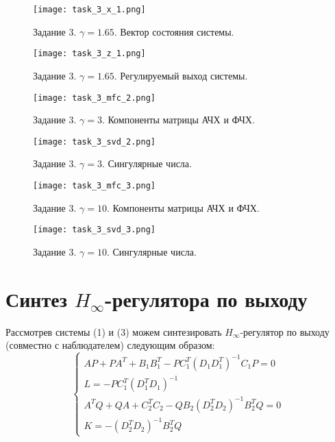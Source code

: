 \begin{figure}[]
    \centering
    \texttt{[image: task\_3\_x\_1.png]}
    \caption{\label{fig:task3_1_3}Задание 3. $\gamma = 1.65$. Вектор состояния системы.}
\end{figure}

\begin{figure}[]
    \centering
    \texttt{[image: task\_3\_z\_1.png]}
    \caption{\label{fig:task3_1_4}Задание 3. $\gamma = 1.65$. Регулируемый выход системы.}
\end{figure}

\begin{figure}[]
    \centering
    \texttt{[image: task\_3\_mfc\_2.png]}
    \caption{\label{fig:task3_2_1}Задание 3. $\gamma = 3$. Компоненты матрицы АЧХ и ФЧХ.}
\end{figure}

\begin{figure}[]
    \centering
    \texttt{[image: task\_3\_svd\_2.png]}
    \caption{\label{fig:task3_2_2}Задание 3. $\gamma = 3$. Сингулярные числа.}
\end{figure}

\begin{figure}[]
    \centering
    \texttt{[image: task\_3\_mfc\_3.png]}
    \caption{\label{fig:task3_1_1}Задание 3. $\gamma = 10$. Компоненты матрицы АЧХ и ФЧХ.}
\end{figure}

\begin{figure}[]
    \centering
    \texttt{[image: task\_3\_svd\_3.png]}
    \caption{\label{fig:task3_1_2}Задание 3. $\gamma = 10$. Сингулярные числа.}
\end{figure}

\pagebreak

\section{Синтез $H_\infty$-регулятора по выходу}

Рассмотрев системы (1) и (3) можем синтезировать $H_\infty$-регулятор по выходу (совместно с наблюдателем) следующим образом:
\begin{equation}
    \begin{cases}
        AP + PA^T + B_1B_1^T - PC_1^T(D_1D_1^T)^{-1}C_1P = 0 \\
        L = - PC_1^T(D_1^TD_1)^{-1} \\
        A^TQ + QA + C_2^TC_2 - QB_2(D_2^TD_2)^{-1}B_2^TQ = 0 \\
        K = -(D_2^TD_2)^{-1}B_2^TQ
    \end{cases}
\end{equation}

